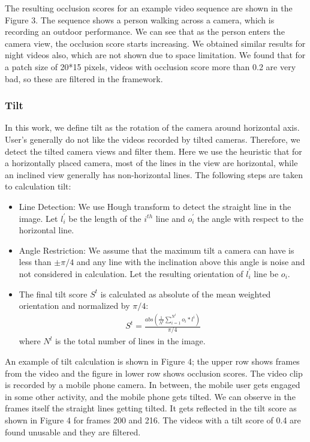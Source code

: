 \documentclass{sig-alternate-05-2015}
\begin{document}
The resulting occlusion scores for an example video sequence
are shown in the Figure 3. The sequence shows a person walking
across a camera, which is recording an outdoor performance. We
can see that as the person enters the camera view, the occlusion
score starts increasing. We obtained similar results for night videos
also, which are not shown due to space limitation. We found that
for a patch size of 20*15 pixels, videos with occlusion score more
than 0.2 are very bad, so these are filtered in the framework.

\subsubsection{Tilt}

In this work, we define tilt as the rotation of the camera around
horizontal axis. User's generally do not like the videos recorded
by tilted cameras. Therefore, we detect the tilted camera views
and filter them. Here we use the heuristic that for a horizontally
placed camera, most of the lines in the view are horizontal, while
an inclined view generally has non-horizontal lines. The following
steps are taken to calculation tilt:

\begin{itemize}
\item Line Detection: We use Hough transform to detect the straight
line in the image. Let $l_i^\prime$ be the length of the $i^{th}$ line and $o_i^\prime$ the angle with respect to the horizontal line.
\item Angle Restriction: We assume that the maximum tilt a camera
can have is less than $\pm \pi/4$ and any line with the inclination
above this angle is noise and not considered in calculation.
Let the resulting orientation of $l_i^\prime$ line be $o_i$.
\item The final tilt score $S^t$ is calculated as absolute of the mean
weighted orientation and normalized by $\pi/4$:
\begin{eqnarray}
S^t=\frac{abs(\frac{1}{N^l}\sum_{i=1}^{N^l}o_i*l^i)}{\pi/4}
\end{eqnarray}
where $N^l$ is the total number of lines in the image.
\end{itemize}

An example of tilt calculation is shown in Figure 4; the upper
row shows frames from the video and the figure in lower row shows
occlusion scores. The video clip is recorded by a mobile phone
camera. In between, the mobile user gets engaged in some other
activity, and the mobile phone gets tilted. We can observe in the
frames itself the straight lines getting tilted. It gets reflected in the
tilt score as shown in Figure 4 for frames 200 and 216. The videos
with a tilt score of 0.4 are found unusable and they are filtered.
\end{document}
